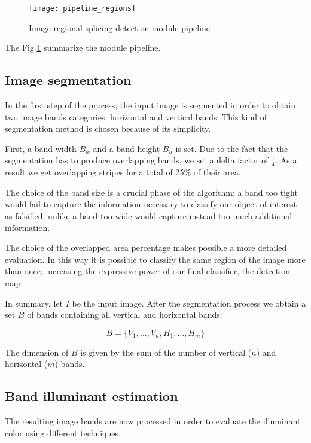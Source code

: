 \begin{figure}[h!]
  \centering
    \texttt{[image: pipeline\_regions]}
    \caption{Image regional splicing detection module pipeline}
    \label{fig:regionsmodulepipeline}
\end{figure}

The Fig \ref{fig:regionsmodulepipeline} summarize the module pipeline.

\subsection{Image segmentation}

In the first step of the process, the input image is segmented in order to obtain two image bands categories: horizontal and vertical bands. This kind of segmentation method is chosen because of its simplicity.

First, a band width $B_w$ and a band height $B_h$ is set. Due to the fact that the segmentation has to produce overlapping bands, we set a delta factor of $\frac{1}{4}$. As a result we get overlapping stripes for a total of 25\% of their area. 

The choice of the band size is a crucial phase of the algorithm: a band too tight would fail to capture the information necessary to classify our object of interest as falsified, unlike a band too wide would capture instead too much additional information.

The choice of the overlapped area percentage makes possible a more detailed evaluation. In this way it is possible to classify the same region of the image more than once, increasing the expressive power of our final classifier, the detection map.
 
In summary, let $I$ be the input image. After the segmentation process we obtain a set $B$ of bands containing all vertical and horizontal bands:

$$
B = \{V_1, \ldots, V_n, H_1, \ldots, H_m\}
$$

The dimension of $B$ is given by the sum of the number of vertical ($n$) and horizontal ($m$) bands.

\subsection{Band illuminant estimation}

The resulting image bands are now processed in order to evaluate the illuminant color using different techniques.

